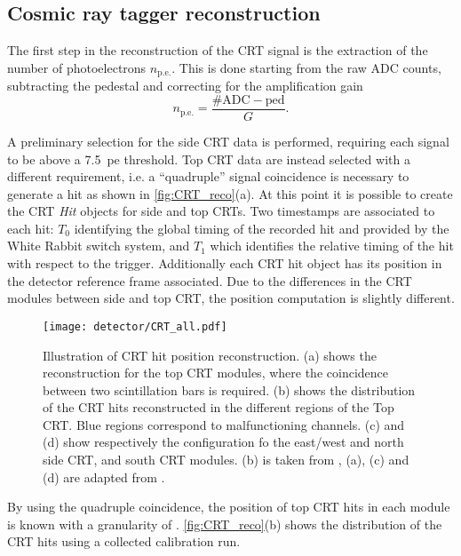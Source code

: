 \subsection{Cosmic ray tagger reconstruction} 

The first step in the reconstruction of the CRT signal is the extraction of the number of photoelectrons $n_\mathrm{p.e.}$. This is done starting from the raw ADC counts, subtracting the pedestal and correcting for the amplification gain \begin{equation}
    n_\mathrm{p.e.} = \frac{\mathrm{\#ADC} - \mathrm{ped}}{G}. 
\end{equation} 

A preliminary selection for the side CRT data is performed, requiring each signal to be above a \SI{7.5}{pe} threshold. Top CRT data are instead selected with a different requirement, i.e. a ``quadruple'' signal coincidence is necessary to generate a hit as shown in \autoref{fig:CRT_reco}(a). At this point it is possible to create the CRT \emph{Hit} objects for side and top CRTs. Two timestamps are associated to each hit: $T_0$ identifying the global timing of the recorded hit and provided by the White Rabbit switch system, and $T_1$ which identifies the relative timing of the hit with respect to the trigger. Additionally each CRT hit object has its position in the detector reference frame associated. Due to the differences in the CRT modules between side and top CRT, the position computation is slightly different. 

\begin{figure}
    \centering
    \texttt{[image: detector/CRT\_all.pdf]}
    \caption[CRT Hit reconstruction in space]{Illustration of CRT hit position reconstruction. (a) shows the reconstruction for the top CRT modules, where the coincidence between two scintillation bars is required. (b) shows the distribution of the CRT hits reconstructed in the different regions of the Top CRT. Blue regions correspond to malfunctioning channels. (c) and (d) show respectively the configuration fo the east/west and north side CRT, and south CRT modules. (b) is taken from \cite{Poppi:2023zmp}, (a), (c) and (d) are adapted from \cite{arteroponsStudyReconstructionNuMuCC}.}
    \label{fig:CRT_reco}
\end{figure}

By using the quadruple coincidence, the position of top CRT hits in each module is known with a granularity of . \autoref{fig:CRT_reco}(b) shows the distribution of the CRT hits using a collected calibration run. 

